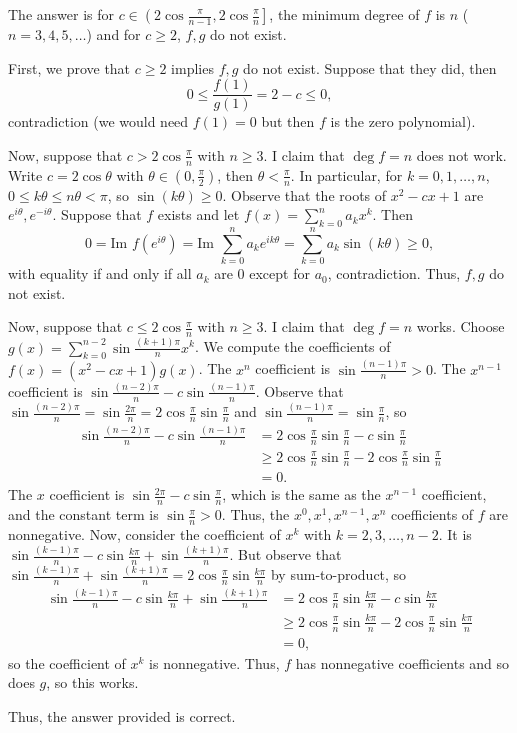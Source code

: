 The answer is for $c\in\left(2\cos\frac{\pi}{n-1},2\cos\frac{\pi}{n}\right]$, the minimum degree of $f$ is $n$ ($n=3,4,5,\ldots$) and for $c\geq2$, $f,g$ do not exist.

First, we prove that $c\geq2$ implies $f,g$ do not exist. Suppose that they did, then \[0\leq\frac{f\left(1\right)}{g\left(1\right)}=2-c\leq0,\] contradiction (we would need $f\left(1\right)=0$ but then $f$ is the zero polynomial).

Now, suppose that $c>2\cos\frac{\pi}{n}$ with $n\geq3$. I claim that $\deg f=n$ does not work. Write $c=2\cos\theta$ with $\theta\in\left(0,\frac{\pi}{2}\right)$, then $\theta<\frac{\pi}{n}$. In particular, for $k=0,1,\ldots,n$, $0\leq k\theta\leq n\theta<\pi$, so $\sin\left(k\theta\right)\geq0$. Observe that the roots of $x^2-cx+1$ are $e^{i\theta},e^{-i\theta}$. Suppose that $f$ exists and let $f\left(x\right)=\displaystyle\sum_{k=0}^na_kx^k$. Then \[0=\text{Im }f\left(e^{i\theta}\right)=\text{Im }\displaystyle\sum_{k=0}^na_ke^{ik\theta}=\displaystyle\sum_{k=0}^na_k\sin\left(k\theta\right)\geq0,\] with equality if and only if all $a_k$ are $0$ except for $a_0$, contradiction. Thus, $f,g$ do not exist.

Now, suppose that $c\leq2\cos\frac{\pi}{n}$ with $n\geq3$. I claim that $\deg f=n$ works. Choose $g\left(x\right)=\displaystyle\sum_{k=0}^{n-2}\sin\frac{\left(k+1\right)\pi}{n}x^k$. We compute the coefficients of $f\left(x\right)=\left(x^2-cx+1\right)g\left(x\right)$. The $x^n$ coefficient is $\sin\frac{\left(n-1\right)\pi}{n}>0$. The $x^{n-1}$ coefficient is $\sin\frac{\left(n-2\right)\pi}{n}-c\sin\frac{\left(n-1\right)\pi}{n}$. Observe that $\sin\frac{\left(n-2\right)\pi}{n}=\sin\frac{2\pi}{n}=2\cos\frac{\pi}{n}\sin\frac{\pi}{n}$ and $\sin\frac{\left(n-1\right)\pi}{n}=\sin\frac{\pi}{n}$, so
\begin{align*}
    \sin\frac{\left(n-2\right)\pi}{n}-c\sin\frac{\left(n-1\right)\pi}{n}&=2\cos\frac{\pi}{n}\sin\frac{\pi}{n}-c\sin\frac{\pi}{n}\\
    &\geq2\cos\frac{\pi}{n}\sin\frac{\pi}{n}-2\cos\frac{\pi}{n}\sin\frac{\pi}{n}\\
    &=0.
\end{align*}
The $x$ coefficient is $\sin\frac{2\pi}{n}-c\sin\frac{\pi}{n}$, which is the same as the $x^{n-1}$ coefficient, and the constant term is $\sin\frac{\pi}{n}>0$. Thus, the $x^0,x^1,x^{n-1},x^n$ coefficients of $f$ are nonnegative. Now, consider the coefficient of $x^k$ with $k=2,3,\ldots,n-2$. It is $\sin\frac{\left(k-1\right)\pi}{n}-c\sin\frac{k\pi}{n}+\sin\frac{\left(k+1\right)\pi}{n}$. But observe that $\sin\frac{\left(k-1\right)\pi}{n}+\sin\frac{\left(k+1\right)\pi}{n}=2\cos\frac{\pi}{n}\sin\frac{k\pi}{n}$ by sum-to-product, so
\begin{align*}
    \sin\frac{\left(k-1\right)\pi}{n}-c\sin\frac{k\pi}{n}+\sin\frac{\left(k+1\right)\pi}{n}&=2\cos\frac{\pi}{n}\sin\frac{k\pi}{n}-c\sin\frac{k\pi}{n}\\
    &\geq2\cos\frac{\pi}{n}\sin\frac{k\pi}{n}-2\cos\frac{\pi}{n}\sin\frac{k\pi}{n}\\
    &=0,
\end{align*}
so the coefficient of $x^k$ is nonnegative. Thus, $f$ has nonnegative coefficients and so does $g$, so this works.

Thus, the answer provided is correct.